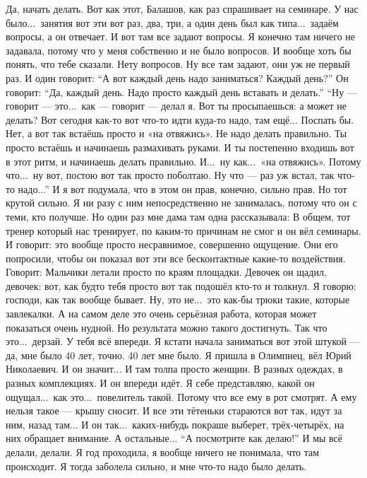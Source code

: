 \M
Да, начать делать.
Вот как этот, Балашов, как раз спрашивает на семинаре.
У нас было...\ занятия вот эти вот раз, два, три, а один день был как типа...\
задаём вопросы, а он отвечает.
И вот там все задают вопросы.
Я конечно там ничего не задавала, потому что у меня собственно и не было вопросов.
И вообще хоть бы понять, что тебе сказали. Нету вопросов.
Ну все там задают, они уж не первый раз.
И один говорит: ``А вот каждый день надо заниматься?
Каждый день?'' Он говорит: ``Да, каждый день.
Надо просто каждый день вставать и делать.''
``Ну --- говорит --- это...\
как --- говорит --- делал я.
Вот ты просыпаешься: а может не делать?
Вот сегодня как-то вот что-то идти куда-то надо, там ещё...
Поспать бы.
Нет, а вот так встаёшь просто и «на отвяжись».
Не надо делать правильно.
Ты просто встаёшь и начинаешь размахивать руками.
И ты постепенно входишь вот в этот ритм,
и начинаешь делать правильно.
И...\ ну как...\ «на отвяжись».
Потому что...\ ну вот, постою вот так просто поболтаю.
Ну что --- раз уж встал, так что-то надо...''
И я вот подумала, что в этом он прав, конечно, сильно прав.
Но тот крутой сильно.
Я ни разу с ним непосредственно не занималась, потому что он
с теми, кто получше.
Но один раз мне дама там одна рассказывала:
В общем, тот тренер который нас тренирует, по каким-то причинам не смог и он вёл семинары.
И говорит: это вообще просто несравнимое, совершенно ощущение.
Они его попросили, чтобы он показал вот эти все бесконтактные какие-то воздействия.
Говорит: Мальчики летали просто по краям площадки.
Девочек он щадил, девочек: вот, как будто тебя просто вот так подошёл кто-то и толкнул.
Я говорю: господи, как так вообще бывает.
Ну, это не...\ это как-бы трюки такие, которые завлекалки.
А на самом деле это очень серьёзная работа, которая может показаться очень нудной.
Но результата можно такого достигнуть.
Так что это...\ дерзай.
У тебя всё впереди.
Я кстати начала заниматься вот этой штукой --- да, мне было 40 лет, точно.
40 лет мне было. Я пришла в Олимпиец, вёл Юрий Николаевич.
И он значит...
И там толпа просто женщин.
В разных одеждах, в разных комплекциях.
И он впереди идёт.
Я себе представляю, какой он ощущал...\ как это...\ повелитель такой.
Потому что все ему в рот смотрят.
А ему нельзя такое --- крышу сносит.
И все эти тётеньки стараются вот так, идут за ним, назад там...
И он так...\ каких-нибудь покраше выберет, трёх-четырёх, на них обращает внимание.
А остальные... ``А посмотрите как делаю!''
И мы всё делали, делали. Я год проходила, я вообще ничего не понимала, что там происходит.
Я тогда заболела сильно, и мне что-то надо было делать.
